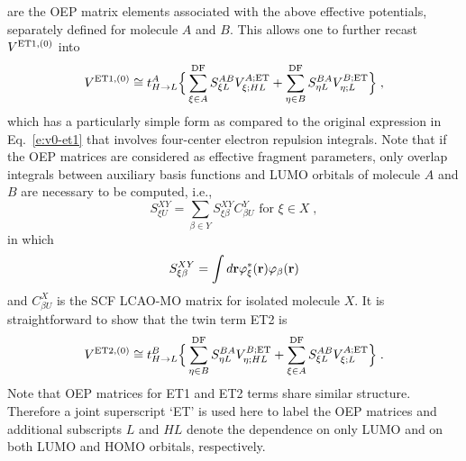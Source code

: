 are the OEP matrix elements associated with the above
effective potentials, separately defined for molecule $A$ and $B$. This allows one to
further recast $V^{{\rm ET1},(0)}$ into
%
\begin{multline}\label{e:v0-et1-oep}
 V^{{\rm ET1},(0)} \cong t_{H\rightarrow L}^A \Big\{ 
 \sum_{\xi\in A}^{\rm DF} S_{\xi L}^{AB} V^{A;{\rm ET}}_{\xi;HL} +
 \sum_{\eta\in B}^{\rm DF} S_{\eta L}^{BA} V^{B;{\rm ET}}_{\eta;L}
 \Big\} \;,
\end{multline}
%
which has a particularly simple form as compared to the original expression
in Eq.~\eqref{e:v0-et1} that involves four\hyp{}center electron repulsion integrals.
Note that if 
the OEP matrices are considered
as effective fragment parameters, %
only overlap integrals between auxiliary basis functions and LUMO orbitals of molecule
$A$ and $B$ are necessary to be computed, i.e.,
%
\begin{equation}
 S^{XY}_{\xi U} = \sum_{\beta\in Y} S_{\xi\beta}^{XY} C_{\beta U}^Y \text{ for $\xi\in X$} \;,
\end{equation}
%
in which 
%
\begin{equation}
 S_{\xi\beta}^{XY} = \int d{\bf r} \varphi_\xi^*({\bf r}) \varphi_\beta({\bf r})
\end{equation}
%
and $C_{\beta U}^X$ is the SCF LCAO-MO matrix for isolated molecule $X$.
It is straightforward to show that the twin term ET2 is
%
\begin{multline}\label{e:v0-et2-oep}
 V^{{\rm ET2},(0)} \cong t_{H\rightarrow L}^B \Big\{ 
 \sum_{\eta\in B}^{\rm DF} S_{\eta L}^{BA} V^{B;{\rm ET}}_{\eta;HL} +
 \sum_{\xi\in A}^{\rm DF} S_{\xi L}^{AB} V^{A;{\rm ET}}_{\xi;L}
 \Big\} \;.
\end{multline}
%
Note that OEP matrices for ET1 and ET2 terms share similar structure.
Therefore a joint superscript `ET' is used here to label the OEP matrices
and additional subscripts
$L$ and $HL$ denote the dependence on only LUMO and on both LUMO and HOMO orbitals, respectively.

